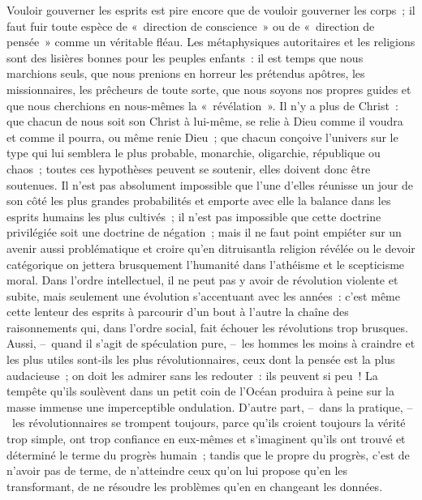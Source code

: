 \documentclass[french,twoside]{book} %
\begin{document}
Vouloir gouverner les esprits est pire encore que de vouloir gouverner les corps ; il faut fuir toute espèce de « direction de conscience » ou de « direction de pensée » comme un véritable fléau. Les métaphysiques autoritaires et les religions sont des lisières bonnes pour les peuples enfants : il est temps que nous marchions seuls, que nous prenions en horreur les prétendus apôtres, les missionnaires, les prêcheurs de toute sorte, que nous soyons nos propres guides et que nous cherchions en nous-mêmes la « révélation ». Il n’y a plus de Christ : que chacun de nous soit son Christ à lui-même, se relie à Dieu comme il voudra et comme il pourra, ou même renie Dieu ; que chacun conçoive l’univers sur le type qui lui semblera le plus probable, monarchie, oligarchie, république ou chaos ; toutes ces hypothèses peuvent se soutenir, elles doivent donc être soutenues. Il n’est pas absolument impossible que l’une d’elles réunisse un jour de son côté les plus grandes probabilités et emporte avec elle la balance dans les esprits humains les plus cultivés ; il n’est pas impossible que cette doctrine privilégiée soit une doctrine de négation ; mais il ne faut point empiéter sur un avenir aussi problématique et croire qu’en ditruisantla religion révélée ou le devoir catégorique on jettera brusquement l’humanité dans l’athéisme et le scepticisme moral. Dans l’ordre intellectuel, il ne peut pas y avoir de révolution violente et subite, mais seulement une évolution s’accentuant avec les années : c’est même cette lenteur des esprits à parcourir d’un bout à l’autre la chaîne des raisonnements qui, dans l’ordre social, fait échouer les révolutions trop brusques. Aussi, – quand il s’agit de spéculation pure, – les hommes les moins à craindre et les plus utiles sont-ils les plus révolutionnaires, ceux dont la pensée est la plus audacieuse ; on doit les admirer sans les redouter : ils peuvent si peu ! La tempête qu’ils soulèvent dans un petit coin de l’Océan produira à peine sur la masse immense une imperceptible ondulation. D’autre part, – dans la pratique, – les révolutionnaires se trompent toujours, parce qu’ils croient toujours la vérité trop simple, ont trop confiance en eux-mêmes et s’imaginent qu’ils ont trouvé et déterminé le terme du progrès humain ; tandis que le propre du progrès, c’est de n’avoir pas de terme, de n’atteindre ceux qu’on lui propose qu’en les transformant, de ne résoudre les problèmes qu’en en changeant les données.\par
\end{document}
